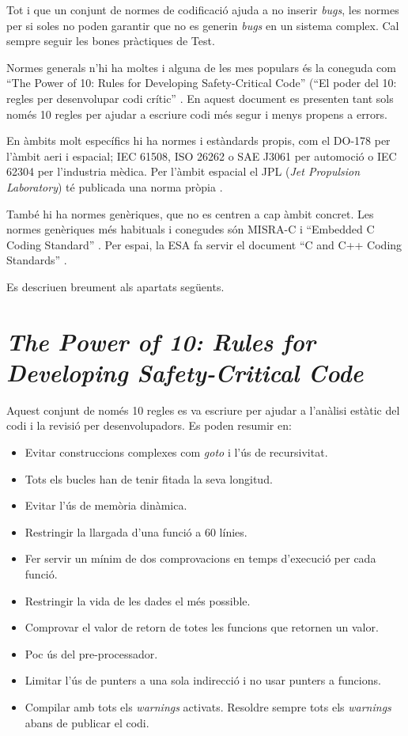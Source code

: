 \begin{remark}
Tot i que un conjunt de normes de codificació ajuda a no inserir {\em bugs}, les normes per si soles no poden garantir que no es generin {\em bugs} en un sistema complex. Cal sempre seguir les bones pràctiques de Test.%
\end{remark}

Normes generals n'hi ha moltes i alguna de les mes populars és la coneguda com ``The Power of 10: Rules for Developing Safety-Critical Code'' (``El poder del 10: regles per desenvolupar codi crític'' \cite{powerof10}. En aquest document es presenten tant sols només 10 regles per ajudar a escriure codi més segur i menys propens a errors. 

En àmbits molt específics hi ha normes i estàndards propis, com el DO-178 per l'àmbit aeri i espacial; IEC 61508, ISO 26262 o SAE J3061 per automoció o IEC 62304 per l'industria mèdica. Per l'àmbit espacial el JPL ({\em Jet Propulsion Laboratory}) té publicada una norma pròpia \cite{JPLCProgramming}.

També hi ha normes genèriques, que no es centren a cap àmbit concret. Les normes genèriques més habituals i conegudes són MISRA-C \cite{MISRAHomepage} i ``Embedded C Coding Standard'' \cite{BARRGuidelines}. Per espai, la \gls{ESA} fa servir el document  ``C and C++ Coding Standards'' \cite{BSSC}.

Es descriuen breument als apartats següents.

\section{\em The Power of 10: Rules for Developing Safety-Critical Code}
Aquest conjunt de només 10 regles es va escriure per ajudar a l'anàlisi estàtic del codi i la revisió per desenvolupadors. Es poden resumir en:
\begin{itemize}
 \item Evitar construccions complexes com {\em goto} i l'ús de recursivitat.
 \item Tots els bucles han de tenir fitada la seva longitud.
 \item Evitar l'ús de memòria dinàmica.
 \item Restringir la llargada d'una funció a 60 línies.
 \item Fer servir un mínim de dos comprovacions en temps d'execució per cada funció.
 \item Restringir la vida de les dades el més possible.
 \item Comprovar el valor de retorn de totes les funcions que retornen un valor.
 \item Poc ús del pre-processador.
 \item Limitar l'ús de punters a una sola indirecció i no usar punters a funcions.
 \item Compilar amb tots els {\em warnings} activats. Resoldre sempre tots els {\em warnings} abans de publicar el codi.
\end{itemize}



